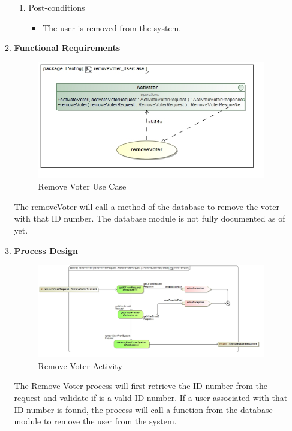 \begin{enumerate}
\begin{enumerate}
\begin{enumerate}
				\item Post-conditions
				\begin{itemize}
					\item The user is removed from the system.
				\end{itemize}
			\end{enumerate}
			
			\newpage
			
			\item \textbf{Functional Requirements}
			\begin{figure}[H]
				\centering
				\includegraphics[width=0.75\linewidth]{../Images/Activator/UseCase/removeVoter_UserCase.jpg}
				\caption{Remove Voter Use Case}
			\end{figure}
			
			The removeVoter will call a method of the database to remove the voter with that ID number. The database module is not fully documented as of yet.
			\newline
			
			\item \textbf{Process Design}
			\begin{figure}[H]
				\centering
				\includegraphics[width=0.75\linewidth]{../Images/Activator/Activity/removeVoter.jpg}
				\caption{Remove Voter Activity}
			\end{figure}
			
				The Remove Voter process will first retrieve the ID number from the request and validate if is a valid ID number. If a user associated with that ID number is found, the process will call a function from the database module to remove the user from the system.
			\newline
		\end{enumerate}
\end{enumerate}